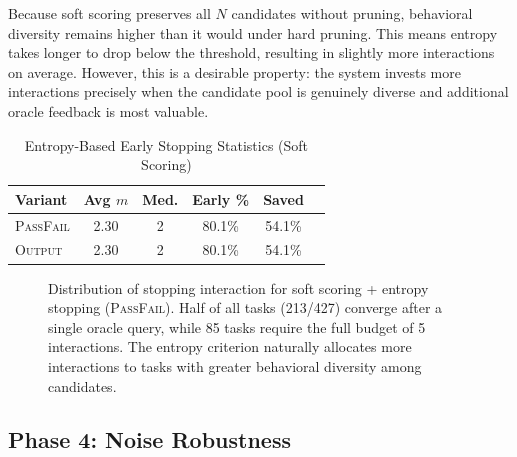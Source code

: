 \documentclass[conference]{IEEEtran}
\begin{document}
Because soft scoring preserves all $N$ candidates without pruning, behavioral diversity remains higher than it would under hard pruning. This means entropy takes longer to drop below the threshold, resulting in slightly more interactions on average. However, this is a desirable property: the system invests more interactions precisely when the candidate pool is genuinely diverse and additional oracle feedback is most valuable.

\begin{table}[t]
\centering
\caption{Entropy-Based Early Stopping Statistics (Soft Scoring)}
\label{tab:efficiency}
\begin{tabular}{lccccc}
\toprule
\textbf{Variant} & \textbf{Avg $m$} & \textbf{Med.} & \textbf{Early \%} & \textbf{Saved} \\
\midrule
\textsc{PassFail} & 2.30 & 2 & 80.1\% & 54.1\% \\
\textsc{Output} & 2.30 & 2 & 80.1\% & 54.1\% \\
\bottomrule
\end{tabular}
\end{table}

\begin{figure}[t]
\centering
{}
\caption{Distribution of stopping interaction for soft scoring + entropy stopping (\textsc{PassFail}). Half of all tasks (213/427) converge after a single oracle query, while 85 tasks require the full budget of 5 interactions. The entropy criterion naturally allocates more interactions to tasks with greater behavioral diversity among candidates.}
\label{fig:efficiency}
\end{figure}

\subsection{Phase 4: Noise Robustness}
\end{document}

